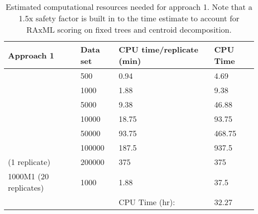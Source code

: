 \documentclass[10pt]{article}
\begin{document}
\begin{table}[h]
\centering
\begin{tabular}{llll}
\hline
Approach 1             & Data set & CPU time/replicate (min) & CPU Time  \\ \hline
                       & 500      & 0.94                   & 4.69    \\
                       & 1000     & 1.88                    & 9.38     \\
                       & 5000     & 9.38                    & 46.88    \\
                       & 10000    & 18.75                    & 93.75     \\
                       & 50000    & 93.75                    & 468.75    \\
                       & 100000   & 187.5                    & 937.5     \\
        (1 replicate)  & 200000   & 375                      & 375       \\
1000M1 (20 replicates) & 1000     & 1.88                    & 37.5      \\
                       &          & CPU Time (hr):           & 32.27 \\ \hline
\end{tabular}
\caption{
  Estimated computational resources needed for approach 1.
  Note that a 1.5x safety factor is built in to the time estimate
  to account for RAxML scoring on fixed trees and centroid decomposition.
  }
\label{table:approach1-compute}

\end{table}
\end{document}
